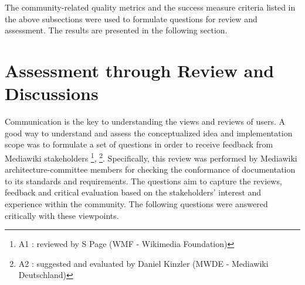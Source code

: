 The community-related quality metrics and the success measure criteria listed in the above subsections were used to formulate questions for review and assessment. The results are presented in the following section.
\section{Assessment through Review and Discussions}
\indent Communication is the key to understanding the views and reviews of users. A good way to understand and assess the conceptualized idea and implementation scope was to formulate a set of questions in order to receive feedback from Mediawiki stakeholders \footnote{A1 : reviewed by S Page (WMF - Wikimedia Foundation)}, \footnote{A2 : suggested and evaluated by Daniel Kinzler (MWDE - Mediawiki Deutschland)}.  Specifically, this review was performed by Mediawiki architecture-committee members for checking the conformance of documentation to its standards and requirements. The questions aim to capture the reviews, feedback and critical evaluation based on the stakeholders' interest and experience within the community. The following questions were answered critically with these viewpoints.

